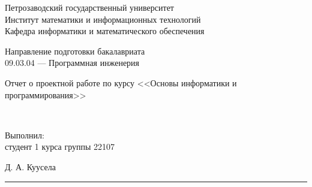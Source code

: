 \documentclass[a4paper,12pt]{article}
\newcommand{\myrule}[1]{\rule{#1}{0.4pt}}
\newcommand{\sign}[2][~]{{\small\myrule{#2}\\[-0.7em]\makebox[#2]{\it #1}}}
\renewcommand{\baselinestretch}{1.50}
\begin{document}

\thispagestyle{empty}
\begin{center}


    \renewcommand{\baselinestretch}{1}
    {\large
        {\sc Петрозаводский государственный университет\\
            Институт математики и информационных технологий\\
            Кафедра информатики и математического обеспечения
        }
    }

\end{center}


\begin{center}
    Направление подготовки бакалавриата \\
    09.03.04 --- Программная инженерия \\
\end{center}

\vfill

\begin{center}
    {\normalsize
    Отчет о проектной работе по курсу <<Основы информатики и программирования>>}

    \medskip

    {\Large {}} \\
\end{center}

\medskip

\begin{flushright}
    \parbox{11cm}{%
        \renewcommand{\baselinestretch}{1.2}
        \normalsize
        Выполнил:\\
        студент 1 курса группы 22107
        \begin{flushright}
            Д. А. Куусела \sign[подпись]{4cm}
        \end{flushright}


    }
\end{flushright}
\end{document}
